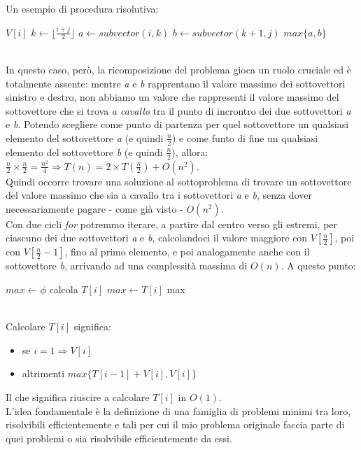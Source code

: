 Un esempio di procedura risolutiva:
\begin{algorithm}
	\label{alg:subDIV1}
	\begin{algorithmic}
				\State \Return $V[i]$
			\EndIf
			\State $k \gets \lfloor\frac{i+j}{2}\rfloor$
			\State $a \gets subvector(i,k)$
			\State $b \gets subvector(k+1,j)$
			\State \Return $max\{a,b\}$
		\EndFunction
	\end{algorithmic}
\end{algorithm} \hfill \\
In questo caso, però, la ricomposizione del problema gioca un ruolo cruciale ed è totalmente assente: mentre \textit{a} e \textit{b} rapprentano il valore massimo dei sottovettori sinistro e destro, non abbiamo un valore che rappresenti il valore massimo del sottovettore che si trova \textit{a cavallo} tra il punto di incrontro dei due sottovettori \textit{a} e \textit{b}. Potendo scegliere come punto di partenza per quel sottovettore un qualsiasi elemento del sottovettore \textit{a} (e quindi $\frac{n}{2}$) e come funto di fine un qualsiasi elemento del sottovettore \textit{b} (e quindi $\frac{n}{2}$), allora: $\frac{n}{2} \times \frac{n}{2} = \frac{n^2}{4} \Rightarrow T(n) = 2\times T(\frac{n}{2}) + O(n^2)$. \\
Quindi occorre trovare una soluzione al sottoproblema di trovare un sottovettore del valore massimo che sia a cavallo tra i sottovettori \textit{a} e \textit{b}, senza dover necessariamente pagare - come già visto - $O(n^2)$. \\
Con due cicli \textit{for} potremmo iterare, a partire dal centro verso gli estremi, per ciascuno dei due sottovettori \textit{a} e \textit{b}, calcolandoci il valore maggiore con $V[\frac{n}{2}]$, poi con $V[\frac{n}{2}-1]$, fino al primo elemento, e poi analogamente anche con il sottovettore \textit{b}, arrivando ad una complessità massima di $O(n)$.
A questo punto:
\begin{algorithm}
	\label{alg:subDIV2}
	\begin{algorithmic}
		\Function{subvectorV3}{V,n}
			\State $max \gets \phi$
			\For { $i \gets 1$ to $n$ }
				\State calcola $T[i]$
				\If { $T[i] > max$ }
					\State $max \gets T[i]$
				\EndIf
			\EndFor
			\State \Return max
		\EndFunction
	\end{algorithmic}
\end{algorithm} \hfill \\
Calcolare $T[i]$ significa:
\begin{itemize}
	\item se $i=1 \Rightarrow V[i]$
	\item altrimenti $max\{T[i-1]+V[i], V[i]\}$
\end{itemize}
Il che significa riuscire a calcolare $T[i]$ in $O(1)$. \\
L'idea fondamentale è la definizione di una famiglia di problemi minimi tra loro, risolvibili efficientemente e tali per cui il mio problema originale faccia parte di quei problemi o sia risolvibile efficientemente da essi.
